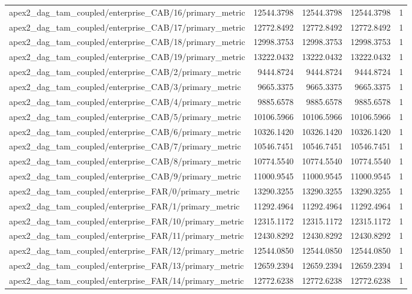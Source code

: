 \begin{table}[h]
\begin{tabular}{lrrrr}
apex2_dag_tam_coupled/enterprise_CAB/16/primary_metric & 12544.3798 & 12544.3798 & 12544.3798 & 1 \\
apex2_dag_tam_coupled/enterprise_CAB/17/primary_metric & 12772.8492 & 12772.8492 & 12772.8492 & 1 \\
apex2_dag_tam_coupled/enterprise_CAB/18/primary_metric & 12998.3753 & 12998.3753 & 12998.3753 & 1 \\
apex2_dag_tam_coupled/enterprise_CAB/19/primary_metric & 13222.0432 & 13222.0432 & 13222.0432 & 1 \\
apex2_dag_tam_coupled/enterprise_CAB/2/primary_metric & 9444.8724 & 9444.8724 & 9444.8724 & 1 \\
apex2_dag_tam_coupled/enterprise_CAB/3/primary_metric & 9665.3375 & 9665.3375 & 9665.3375 & 1 \\
apex2_dag_tam_coupled/enterprise_CAB/4/primary_metric & 9885.6578 & 9885.6578 & 9885.6578 & 1 \\
apex2_dag_tam_coupled/enterprise_CAB/5/primary_metric & 10106.5966 & 10106.5966 & 10106.5966 & 1 \\
apex2_dag_tam_coupled/enterprise_CAB/6/primary_metric & 10326.1420 & 10326.1420 & 10326.1420 & 1 \\
apex2_dag_tam_coupled/enterprise_CAB/7/primary_metric & 10546.7451 & 10546.7451 & 10546.7451 & 1 \\
apex2_dag_tam_coupled/enterprise_CAB/8/primary_metric & 10774.5540 & 10774.5540 & 10774.5540 & 1 \\
apex2_dag_tam_coupled/enterprise_CAB/9/primary_metric & 11000.9545 & 11000.9545 & 11000.9545 & 1 \\
apex2_dag_tam_coupled/enterprise_FAR/0/primary_metric & 13290.3255 & 13290.3255 & 13290.3255 & 1 \\
apex2_dag_tam_coupled/enterprise_FAR/1/primary_metric & 11292.4964 & 11292.4964 & 11292.4964 & 1 \\
apex2_dag_tam_coupled/enterprise_FAR/10/primary_metric & 12315.1172 & 12315.1172 & 12315.1172 & 1 \\
apex2_dag_tam_coupled/enterprise_FAR/11/primary_metric & 12430.8292 & 12430.8292 & 12430.8292 & 1 \\
apex2_dag_tam_coupled/enterprise_FAR/12/primary_metric & 12544.0850 & 12544.0850 & 12544.0850 & 1 \\
apex2_dag_tam_coupled/enterprise_FAR/13/primary_metric & 12659.2394 & 12659.2394 & 12659.2394 & 1 \\
apex2_dag_tam_coupled/enterprise_FAR/14/primary_metric & 12772.6238 & 12772.6238 & 12772.6238 & 1 \\

\end{tabular}
\end{table}
